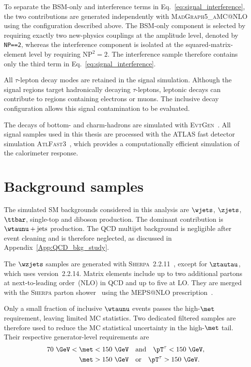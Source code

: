 To separate the BSM-only and interference terms in Eq.~\eqref{eq:signal_interference}, the two contributions are generated independently with \textsc{MadGraph5\_aMC@NLO} using the configuration described above.
The BSM-only component is selected by requiring exactly two new-physics couplings at the amplitude level, denoted by \texttt{NP==2}, whereas the interference component is isolated at the squared-matrix-element level by requiring $\mathrm{NP}^{2}=2$.
The interference sample therefore contains only the third term in Eq.~\eqref{eq:signal_interference}.

All $\tau$-lepton decay modes are retained in the signal simulation.
Although the signal regions target hadronically decaying $\tau$-leptons, leptonic decays can contribute to regions containing electrons or muons.
The inclusive decay configuration allows this signal contamination to be evaluated.

The decays of bottom- and charm-hadrons are simulated with \textsc{EvtGen}~\cite{Lange2001EvtGen}.
All signal samples used in this thesis are processed with the ATLAS fast detector simulation \textsc{AtlFast3}~\cite{ATLAS2022AtlFast3}, which provides a computationally efficient simulation of the calorimeter response.

\section{Background samples}
\label{sec:background_samples}

The simulated SM backgrounds considered in this analysis are $\wjets$, $\zjets$, $\ttbar$, single-top and diboson production.
The dominant contribution is $\wtaunu+\mathrm{jets}$ production.
The QCD multijet background is negligible after event cleaning and is therefore neglected, as discussed in Appendix~\ref{App:QCD_bkg_study}.

The $\wzjets$ samples are generated with \textsc{Sherpa}~2.2.11~\cite{Bothmann2019Sherpa22}, except for $\ztautau$, which uses version~2.2.14.
Matrix elements include up to two additional partons at next-to-leading order~(NLO) in QCD and up to five at LO.
They are merged with the \textsc{Sherpa} parton shower~\cite{Schumann2008SherpaPS} using the MEPS@NLO prescription~\cite{Hoche2012MEPSNLO,Hoche2013MEPSNLO,Catani2001MEPS,Hoche2009MEPS}.

Only a small fraction of inclusive $\wtaunu$ events passes the high-$\met$ requirement, leaving limited MC statistics.
Two dedicated filtered samples are therefore used to reduce the MC statistical uncertainty in the high-$\met$ tail.
Their respective generator-level requirements are
\begin{align}
    70~\GeV < \met < 150~\GeV
    &\quad\mathrm{and}\quad
    \pT^{\tau} < 150~\GeV, \notag\\
    \met > 150~\GeV
    &\quad\mathrm{or}\quad
    \pT^{\tau} > 150~\GeV.
\end{align}

